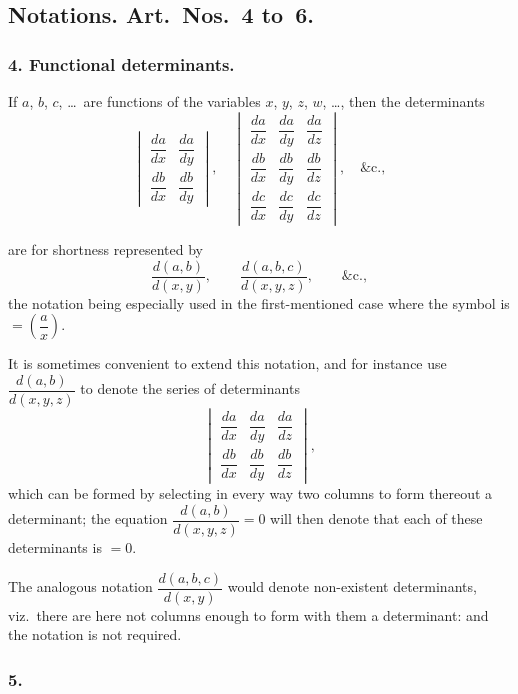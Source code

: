\documentclass[11pt,a4paper]{book}
\begin{document}
\subsection*{Notations. Art.~Nos.~4 to~6.}

\subsubsection*{4. Functional determinants.}

If $a$, $b$, $c$, \ldots\ are functions of the variables $x$, $y$, $z$, $w$, \ldots, then the determinants
\[
\begin{vmatrix}
\dfrac{da}{dx} & \dfrac{da}{dy} \\[0.8em]
\dfrac{db}{dx} & \dfrac{db}{dy}
\end{vmatrix},
\quad
\begin{vmatrix}
\dfrac{da}{dx} & \dfrac{da}{dy} & \dfrac{da}{dz} \\[0.5em]
\dfrac{db}{dx} & \dfrac{db}{dy} & \dfrac{db}{dz} \\[0.5em]
\dfrac{dc}{dx} & \dfrac{dc}{dy} & \dfrac{dc}{dz}
\end{vmatrix},
\quad \&\text{c.},
\]

\newpage
\setcounter{page}{116}

are for shortness represented by
\[
\frac{d(a, b)}{d(x, y)}, \qquad \frac{d(a, b, c)}{d(x, y, z)}, \qquad \&\text{c.},
\]
the notation being especially used in the first-mentioned case where the symbol is $= \left(\dfrac{a}{x}\right)$.

It is sometimes convenient to extend this notation, and for instance use $\dfrac{d(a, b)}{d(x, y, z)}$ to denote the series of determinants
\[
\begin{vmatrix}
\dfrac{da}{dx} & \dfrac{da}{dy} & \dfrac{da}{dz} \\[0.5em]
\dfrac{db}{dx} & \dfrac{db}{dy} & \dfrac{db}{dz}
\end{vmatrix},
\]
which can be formed by selecting in every way two columns to form thereout a determinant; the equation $\dfrac{d(a, b)}{d(x, y, z)} = 0$ will then denote that each of these determinants is $= 0$.

The analogous notation $\dfrac{d(a, b, c)}{d(x, y)}$ would denote non-existent determinants, viz.~there are here not columns enough to form with them a determinant: and the notation is not required.

\subsubsection*{5.}
\end{document}
